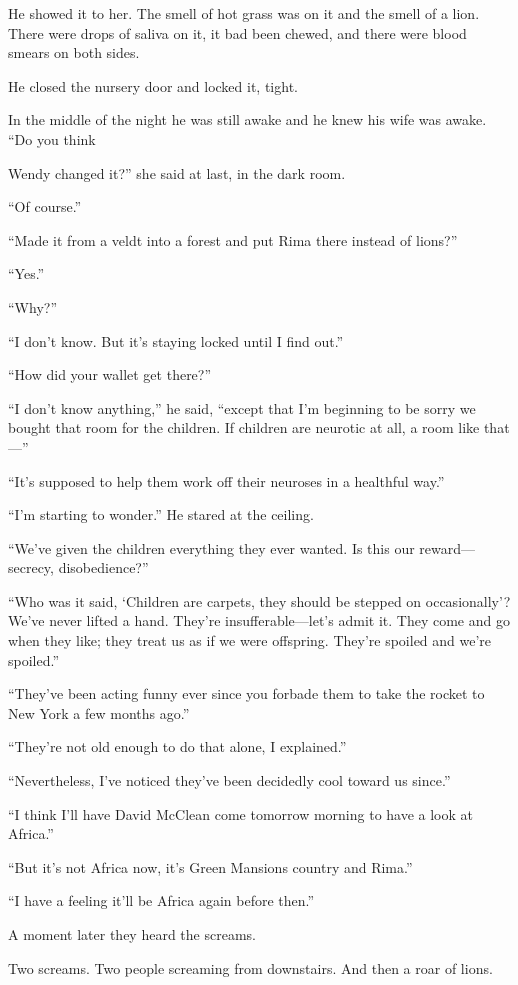 \documentclass[10pt,a4paper]{article}
\begin{document}
He showed it to her. The smell of hot grass was on it and the smell of a lion. There were drops of saliva on it, it bad been chewed, and there were blood smears on both sides.

He closed the nursery door and locked it, tight.

In the middle of the night he was still awake and he knew his wife was awake. “Do you think

Wendy changed it?” she said at last, in the dark room.

“Of course.”

“Made it from a veldt into a forest and put Rima there instead of lions?”

“Yes.”

“Why?”

“I don’t know. But it’s staying locked until I find out.”

“How did your wallet get there?”

“I don’t know anything,” he said, “except that I’m beginning to be sorry we bought that room for the children. If children are neurotic at all, a room like that—”

“It’s supposed to help them work off their neuroses in a healthful way.”

“I’m starting to wonder.” He stared at the ceiling.

“We’ve given the children everything they ever wanted. Is this our reward—secrecy, disobedience?”

“Who was it said, ‘Children are carpets, they should be stepped on occasionally’? We’ve never lifted a hand. They’re insufferable—let’s admit it. They come and go when they like; they treat us as if we were offspring. They’re spoiled and we’re spoiled.”

“They’ve been acting funny ever since you forbade them to take the rocket to New York a few months ago.”

“They’re not old enough to do that alone, I explained.”

“Nevertheless, I’ve noticed they’ve been decidedly cool toward us since.”

“I think I’ll have David McClean come tomorrow morning to have a look at Africa.”

“But it’s not Africa now, it’s Green Mansions country and Rima.”

“I have a feeling it’ll be Africa again before then.”

A moment later they heard the screams.

Two screams. Two people screaming from downstairs. And then a roar of lions.
\end{document}

